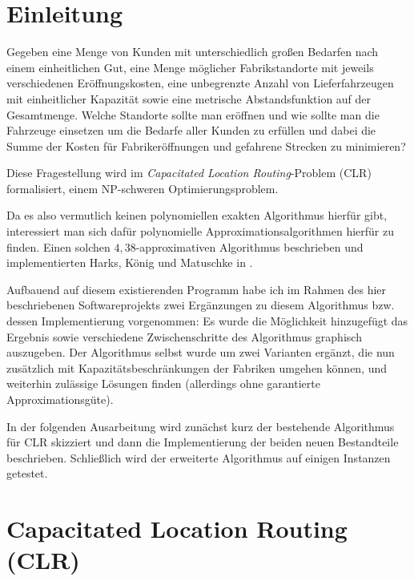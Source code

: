 \documentclass[a4paper,ngerman,11pt,bibtotoc]{scrartcl}
\theoremstyle{definition}
\theoremstyle{plain}
\theoremstyle{remark}
\newcommand{\CLR}{CLR}
\begin{document}


\tableofcontents

\newpage
	
\section*{Einleitung}

Gegeben eine Menge von Kunden mit unterschiedlich großen Bedarfen nach einem einheitlichen Gut, eine Menge möglicher Fabrikstandorte mit jeweils verschiedenen Eröffnungskosten, eine unbegrenzte Anzahl von Lieferfahrzeugen mit einheitlicher Kapazität sowie eine metrische Abstandsfunktion auf der Gesamtmenge. Welche Standorte sollte man eröffnen und wie sollte man die Fahrzeuge einsetzen um die Bedarfe aller Kunden zu erfüllen und dabei die Summe der Kosten für Fabrikeröffnungen und gefahrene Strecken zu minimieren?

Diese Fragestellung wird im \emph{Capacitated Location Routing}-Problem (\CLR) formalisiert, einem NP-schweren Optimierungsproblem.

Da es also vermutlich keinen polynomiellen exakten Algorithmus hierfür gibt, interessiert man sich dafür polynomielle Approximationsalgorithmen hierfür zu finden. Einen solchen $4,38$-approximativen Algorithmus beschrieben und implementierten Harks, König und Matuschke in \cite{AAfCLR}. 

Aufbauend auf diesem existierenden Programm habe ich im Rahmen des hier beschriebenen Softwareprojekts zwei Ergänzungen zu diesem Algorithmus bzw. dessen Implementierung vorgenommen: Es wurde die Möglichkeit hinzugefügt das Ergebnis sowie verschiedene Zwischenschritte des Algorithmus graphisch auszugeben. Der Algorithmus selbst wurde um zwei Varianten ergänzt, die nun zusätzlich mit Kapazitätsbeschränkungen der Fabriken umgehen können, und weiterhin zulässige Lösungen finden (allerdings ohne garantierte Approximationsgüte).

In der folgenden Ausarbeitung wird zunächst kurz der bestehende Algorithmus für \CLR{} skizziert und dann die Implementierung der beiden neuen Bestandteile beschrieben. Schließlich wird der erweiterte Algorithmus auf einigen Instanzen getestet.


\newpage

\section{Capacitated Location Routing (\CLR)}
\end{document}
